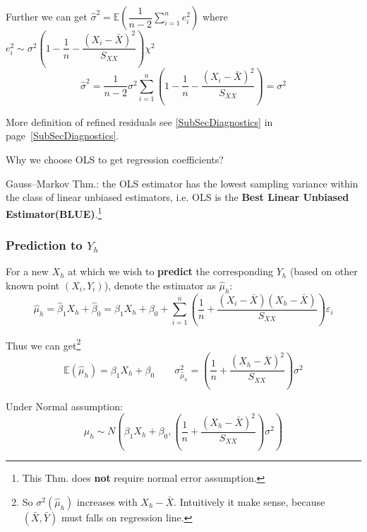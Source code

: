     Further we can get $ \hat{\sigma }^2=\mathbb{E}(\dfrac{1}{n-2}\sum_{i=1}^ne_i^2) $ where $ e_i^2\sim \sigma ^2\left( 1-\dfrac{1}{n}-\dfrac{(X_i-\bar{X})^2}{S_{XX}} \right)\chi^2 $
    \begin{equation}
        \hat{\sigma }^2=\dfrac{1}{n-2}\sigma ^2\sum_{i=1}^n(1-\dfrac{1}{n}-\dfrac{(X_i-\bar{X})^2}{S_{XX}})=\sigma ^2
    \end{equation}
    
    More definition of refined residuals see \autoref{SubSecDiagnostics} in page~\ref{SubSecDiagnostics}.
    


\begin{point}
    Why we choose OLS to get regression coefficients?
\end{point}

    Gauss–Markov Thm.: the OLS estimator has the lowest sampling variance within the class of linear unbiased estimators, i.e. OLS is the \textbf{Best Linear Unbiased Estimator(BLUE)}.\footnote{This Thm. does \textbf{not }require normal error assumption.}



\subsubsection{Prediction to $ Y_h $}
    For a new $ X_h $ at which we wish to \textbf{predict }the corresponding $ Y_h $ (based on other known point $ (X_i,Y_i) $), denote the estimator as $ \hat{\mu}_h $:
    \begin{equation}
        \hat{\mu}_h=\hat{\beta}_1X_h+\hat{\beta}_0 =\beta_1X_h+\beta _0+\sum_{i=1}^n\left( \dfrac{1}{n}+\dfrac{(X_i-\bar{X})(X_h-\bar{X})}{S_{XX}} \right)\varepsilon _i
    \end{equation}
    
    Thus we can get\footnote{So $ \sigma ^2(\hat{\mu }_h) $ increases with $ X_h-\bar{X} $. Intuitively it make sense, because $ (\bar{X},\bar{Y})$ must falls on regression line.}
    \begin{equation}
        \mathbb{E}(\hat{\mu}_h)= \beta _1X_h+\beta _0\qquad \sigma ^2_{\hat{\mu}_h}=\left( \dfrac{1}{n}+\dfrac{(X_h-\bar{X})^2}{S_{XX}} \right)\sigma^2
    \end{equation}
    
    Under Normal assumption:
    \begin{equation}
        \hat{\mu}_h\sim N(\beta _1X_h+\beta _0,\left( \dfrac{1}{n}+\dfrac{(X_h-\bar{X})^2}{S_{XX}} \right)\sigma^2) 
    \end{equation}
    
